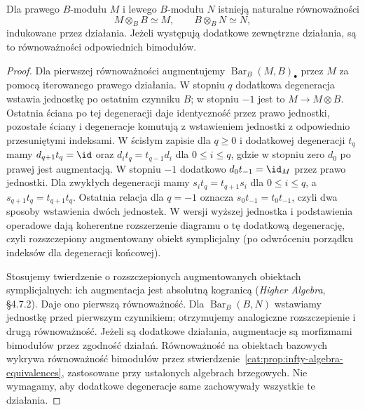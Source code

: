 \begin{stwierdzenie}\label{cat:prop:infty-relative-tensor-unit}
Dla prawego $B$-modułu $M$ i lewego $B$-modułu $N$ istnieją naturalne równoważności
\[
 M\otimes_B B\simeq M,\qquad B\otimes_B N\simeq N,
\]
indukowane przez działania. Jeżeli występują dodatkowe zewnętrzne działania, są to równoważności odpowiednich bimodułów.
\end{stwierdzenie}
\begin{proof}
Dla pierwszej równoważności augmentujemy $\operatorname{Bar}_B(M,B)_\bullet$ przez $M$ za pomocą iterowanego prawego działania. W stopniu $q$ dodatkowa degeneracja wstawia jednostkę po ostatnim czynniku $B$; w stopniu $-1$ jest to $M\to M\otimes B$. Ostatnia ściana po tej degeneracji daje identyczność przez prawo jednostki, pozostałe ściany i degeneracje komutują z wstawieniem jednostki z odpowiednio przesuniętymi indeksami. W ścisłym zapisie dla $q\geq0$ i dodatkowej degeneracji $t_q$ mamy $d_{q+1}t_q=\id$ oraz $d_i t_q=t_{q-1}d_i$ dla $0\leq i\leq q$, gdzie w stopniu zero $d_0$ po prawej jest augmentacją. W stopniu $-1$ dodatkowo $d_0t_{-1}=\id_M$ przez prawo jednostki. Dla zwykłych degeneracji mamy $s_i t_q=t_{q+1}s_i$ dla $0\leq i\leq q$, a $s_{q+1}t_q=t_{q+1}t_q$. Ostatnia relacja dla $q=-1$ oznacza $s_0t_{-1}=t_0t_{-1}$, czyli dwa sposoby wstawienia dwóch jednostek. W wersji wyższej jednostka i podstawienia operadowe dają koherentne rozszerzenie diagramu o tę dodatkową degenerację, czyli rozszczepiony augmentowany obiekt symplicjalny (po odwróceniu porządku indeksów dla degeneracji końcowej).

Stosujemy twierdzenie o rozszczepionych augmentowanych obiektach symplicjalnych: ich augmentacja jest absolutną kogranicą (\emph{Higher Algebra}, \S4.7.2). Daje ono pierwszą równoważność. Dla $\operatorname{Bar}_B(B,N)$ wstawiamy jednostkę przed pierwszym czynnikiem; otrzymujemy analogiczne rozszczepienie i drugą równoważność. Jeżeli są dodatkowe działania, augmentacje są morfizmami bimodułów przez zgodność działań. Równoważność na obiektach bazowych wykrywa równoważność bimodułów przez stwierdzenie~\ref{cat:prop:infty-algebra-equivalences}, zastosowane przy ustalonych algebrach brzegowych. Nie wymagamy, aby dodatkowe degeneracje same zachowywały wszystkie te działania.
\end{proof}

